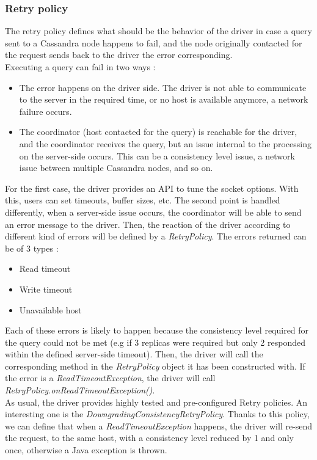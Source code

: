 \documentclass[a4paper]{report}
\begin{document}
\subsubsection{Retry policy}
The retry policy defines what should be the behavior of the driver in case a query sent to a Cassandra node happens to fail, and the node originally contacted for the request sends back to the driver the error corresponding.\\
Executing a query can fail in two ways : 
\begin{itemize}
   \item The error happens on the driver side. The driver is not able to communicate to the server in the required time, or no host is available anymore, a network failure occurs.
   \item The coordinator (host contacted for the query) is reachable for the driver, and the coordinator receives the query, but an issue internal to the processing on the server-side occurs. This can be a consistency level issue, a network issue between multiple Cassandra nodes, and so on.
\end{itemize}
For the first case, the driver provides an API to tune the socket options. With this, users can set timeouts, buffer sizes, etc.
The second point is handled differently, when a server-side issue occurs, the coordinator will be able to send an error message to the driver. Then, the reaction of the driver according to different kind of errors will be defined by a \emph{RetryPolicy}.
The errors returned can be of 3 types : 
\begin{itemize}
   \item Read timeout
   \item Write timeout
   \item Unavailable host
\end{itemize}
Each of these errors is likely to happen because the consistency level required for the query could not be met (e.g if 3 replicas were required but only 2 responded within the defined server-side timeout). Then, the driver will call the corresponding method in the \emph{RetryPolicy} object it has been constructed with. If the error is a \emph{ReadTimeoutException}, the driver will call \emph{RetryPolicy.onReadTimeoutException()}.\\
As usual, the driver provides highly tested and pre-configured Retry policies. An interesting one is the \emph{DowngradingConsistencyRetryPolicy}. Thanks to this policy, we can define that when a \emph{ReadTimeoutException} happens, the driver will re-send the request, to the same host, with a consistency level reduced by 1 and only once, otherwise a Java exception is thrown.
\end{document}
